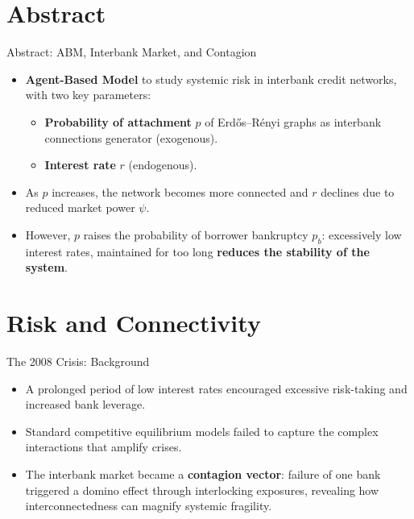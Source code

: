 \section{Abstract}\label{sec:1}

\begin{frame}{Abstract: ABM, Interbank Market, and Contagion}
  \begin{itemize}
    \item \textbf{Agent-Based Model} to study systemic risk in interbank credit networks, with two key parameters:
    \begin{itemize}
    \item \textbf{Probability of attachment} $p$ of Erd\H{o}s--R\'enyi graphs as interbank connections generator (exogenous).
    \item \textbf{Interest rate} $r$ (endogenous).    
    \end{itemize}
    \item As $p$ increases, the network becomes more connected and $r$ declines due to reduced market power $\psi$.
    \item However, $p$ raises the probability of borrower bankruptcy $p_b$: excessively low interest rates, maintained for too long \textbf{reduces the stability of the system}.
  \end{itemize}
\end{frame}

\section{Risk and Connectivity}\label{sec:2}

\begin{frame}{The 2008 Crisis: Background}
  \begin{itemize}
    \item A prolonged period of low interest rates encouraged excessive risk-taking and increased bank leverage.
    \item Standard competitive equilibrium models failed to capture the complex interactions that amplify crises.
    \item The interbank market became a \textbf{contagion vector}: failure of one bank triggered a domino effect through interlocking exposures, revealing how interconnectedness can magnify systemic fragility.
  \end{itemize}
\end{frame}

